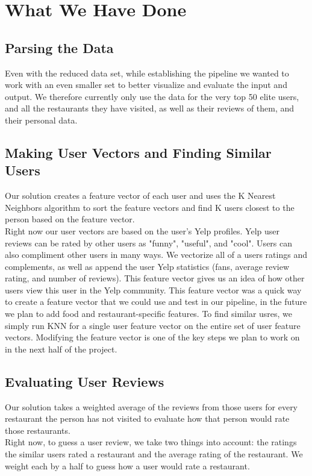 \documentclass[10pt,twocolumn,letterpaper]{article}
\begin{document}
\section{What We Have Done}
\subsection{Parsing the Data}
Even with the reduced data set, while establishing the pipeline we wanted to work with an even smaller set to better visualize and evaluate the input and output. We therefore currently only use the data for the very top 50 elite users, and all the restaurants they have visited, as well as their reviews of them, and their personal data.
\subsection{Making User Vectors and Finding Similar Users}
Our solution creates a feature vector of each user and uses the K Nearest Neighbors algorithm to sort the feature vectors and find K users closest to the person based on the feature vector.
\\[0.5em]
\indent Right now our user vectors are based on the user's Yelp profiles. Yelp user reviews can be rated by other users as "funny", "useful", and "cool". Users can also compliment other users in many ways. We vectorize all of a users ratings and complements, as well as append the user Yelp statistics (fans, average review rating, and number of reviews). This feature vector gives us an idea of how other users view this user in the Yelp community. This feature vector was a quick way to create a feature vector that we could use and test in our pipeline, in the future we plan to add food and restaurant-specific features. To find similar usres, we simply run KNN for a single user feature vector on the entire set of user feature vectors. Modifying the feature vector is one of the key steps we plan to work on in the next half of the project.
\subsection{Evaluating User Reviews}
Our solution takes a weighted average of the reviews from those users for every restaurant the person has not visited to evaluate how that person would rate those restaurants.
\\[0.5em]
\indent Right now, to guess a user review, we take two things into account: the ratings the similar users rated a restaurant and the average rating of the restaurant. We weight each by a half to guess how a user would rate a restaurant.
\end{document}
